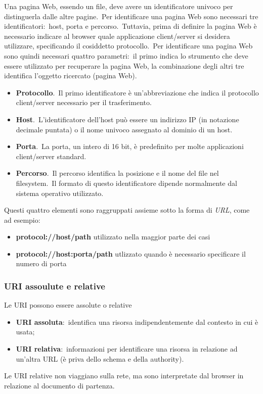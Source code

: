 Una pagina Web, essendo un file, deve avere un identificatore univoco per distinguerla dalle altre pagine.\
Per identificare una pagina Web sono necessari tre identificatori:\ host, porta e percorso.\
Tuttavia, prima di definire la pagina Web è necessario indicare al browser quale applicazione client/server si desidera utilizzare, specificando il cosiddetto protocollo.\
Per identificare una pagina Web sono quindi necessari quattro parametri:\ il primo indica lo strumento che deve essere utilizzato per recuperare la pagina Web, la combinazione degli altri tre identifica l'oggetto ricercato (pagina Web).
\begin{itemize}
    \item \textbf{Protocollo}.\ Il primo identificatore è un'abbreviazione che indica il protocollo client/server necessario per il trasferimento.
    \item \textbf{Host}.\ L'identificatore dell'host può essere un indirizzo IP (in notazione decimale puntata) o il nome univoco assegnato al dominio di un host.
    \item \textbf{Porta}.\ La porta, un intero di 16 bit, è predefinito per molte applicazioni client/server standard.
    \item \textbf{Percorso}.\ Il percorso identifica la posizione e il nome del file nel filesystem.\ Il formato di questo identificatore dipende normalmente dal sistema operativo utilizzato.
\end{itemize}
Questi quattro elementi sono raggruppati assieme sotto la forma di \emph{URL}, come ad esempio:
\begin{itemize}
    \item \textbf{protocol://host/path} utilizzato nella maggior parte dei casi
    \item \textbf{protocol://host:porta/path} utlizzato quando è necessario specificare il numero di porta
\end{itemize}

\subsubsection{URI assoulute e relative}

Le URI possono essere assolute o relative
\begin{itemize}
    \item \textbf{URI assoluta}:\ identifica una risorsa indipendentemente dal contesto in cui è usata;
    \item \textbf{URI relativa}:\ informazioni per identificare una risorsa in relazione ad un'altra URL (è priva dello schema e della authority).
\end{itemize}
Le URI relative non viaggiano sulla rete, ma sono interpretate dal browser in relazione al documento di partenza.

